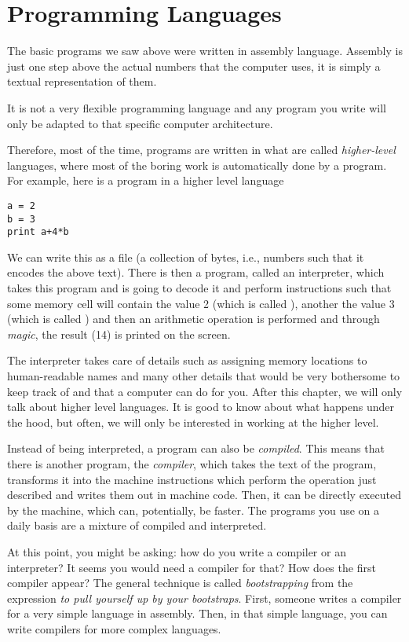 \section{Programming Languages}

The basic programs we saw above were written in assembly language. Assembly is
just one step above the actual numbers that the computer uses, it is simply a
textual representation of them.

It is not a very flexible programming language and any program you write will
only be adapted to that specific computer architecture.

Therefore, most of the time, programs are written in what are called
\emph{higher-level} languages, where most of the boring work is automatically
done by a program. For example, here is a program in a higher level language

\begin{verbatim}
a = 2
b = 3
print a+4*b
\end{verbatim}

We can write this as a file (a collection of bytes, i.e., numbers such that it
encodes the above text). There is then a program, called an interpreter, which
takes this program and is going to decode it and perform instructions such that
some memory cell will contain the value 2 (which is called ), another
the value 3 (which is called ) and then an arithmetic operation is
performed and through \emph{magic}, the result (14) is printed on the screen.

The interpreter takes care of details such as assigning memory locations to
human-readable names and many other details that would be very bothersome to
keep track of and that a computer can do for you. After this chapter, we will
only talk about higher level languages. It is good to know about what happens
under the hood, but often, we will only be interested in working at the higher
level.

Instead of being interpreted, a program can also be \emph{compiled}. This means
that there is another program, the \emph{compiler}, which takes the text of the
program, transforms it into the machine instructions which perform the
operation just described and writes them out in machine code. Then, it can be
directly executed by the machine, which can, potentially, be faster. The
programs you use on a daily basis are a mixture of compiled and interpreted.

At this point, you might be asking: how do you write a compiler or an
interpreter? It seems you would need a compiler for that? How does the first
compiler appear? The general technique is called \emph{bootstrapping} from the
expression \emph{to pull yourself up by your bootstraps}. First, someone writes
a compiler for a very simple language in assembly. Then, in that simple
language, you can write compilers for more complex languages.

